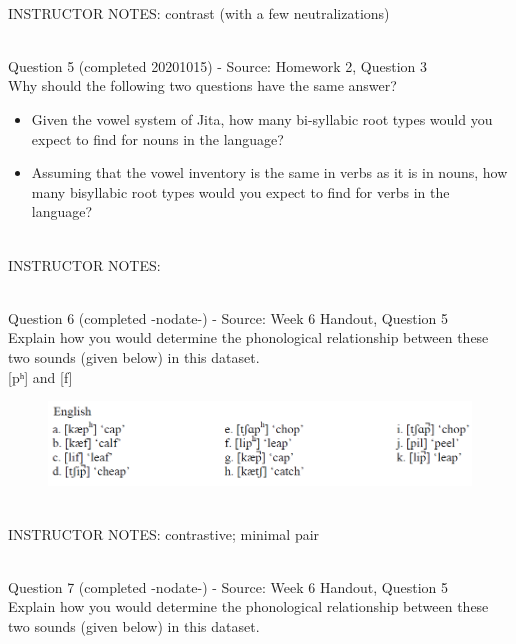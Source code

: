 \documentclass[12pt]{article}
\begin{document}
~\\
INSTRUCTOR NOTES: contrast (with a few neutralizations)


~\\

{\large Question 5} (completed 20201015) - Source: Homework 2, Question 3\\

Why should the following two questions have the same answer?\\

\begin{itemize} \item Given the vowel system of Jita, how many bi-syllabic root types would you expect to find for nouns in the language? \item Assuming that the vowel inventory is the same in verbs as it is in nouns, how many bisyllabic root types would you expect to find for verbs in the language? \end{itemize}


~\\
INSTRUCTOR NOTES: 


~\\

{\large Question 6} (completed -nodate-) - Source: Week 6 Handout, Question 5\\

Explain how you would determine the phonological relationship between these two sounds (given below) in this dataset.\\

{[pʰ]} and {[f]}

\begin{figure}[H]
\includegraphics{../images/english_labials.png}
\end{figure}

~\\
INSTRUCTOR NOTES: contrastive; minimal pair


~\\

{\large Question 7} (completed -nodate-) - Source: Week 6 Handout, Question 5\\

Explain how you would determine the phonological relationship between these two sounds (given below) in this dataset.\\
\end{document}
